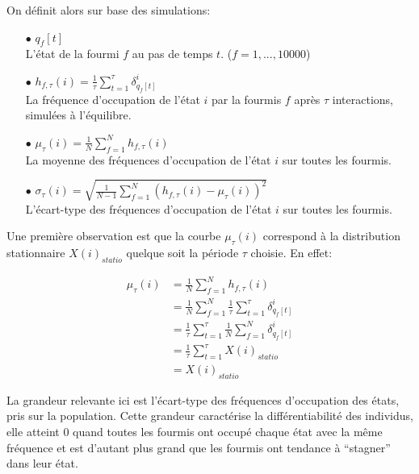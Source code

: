 On définit alors sur base des simulations:

\begin{itemize}

\item[$\bullet$] $q_f[t]$\\
L'état de la fourmi $f$ au pas de temps $t$. ($f=1,...,10000$)\\

\item[$\bullet$] $h_{f,\tau}(i)=\frac{1}{\tau} \sum_{t=1}^{\tau}\delta_{q_f[t]}^i$ \\
La fréquence d'occupation de l'état $i$ par la fourmis $f$ après $\tau$ interactions, simulées à l'équilibre.\\


\item[$\bullet$] $\mu_{\tau}(i) = \frac{1}{N}\sum_{f=1}^N h_{f,\tau}(i)$ \\
La moyenne des fréquences d'occupation de l'état $i$ sur toutes les fourmis.\\

\item[$\bullet$] $\sigma_{\tau}(i) = \sqrt{\frac{1}{N-1}\sum_{f=1}^N (h_{f,\tau}(i)-\mu_{\tau}(i))^2}$ \\
L'écart-type des fréquences d'occupation de l'état $i$ sur toutes les fourmis.\\
\end{itemize}

Une première observation est que la courbe $\mu_{\tau}(i)$ correspond à la distribution stationnaire $X(i)_{statio}$ quelque soit la période $\tau$ choisie. En effet:

\begin{equation}
\begin{aligned}
\mu_{\tau}(i) 	&= \frac{1}{N}\sum_{f=1}^N h_{f,\tau}(i)\\
				&= \frac{1}{N}\sum_{f=1}^N \frac{1}{\tau} \sum_{t=1}^{\tau}\delta_{q_f[t]}^i\\
				&= \frac{1}{\tau} \sum_{t=1}^{\tau} \frac{1}{N}\sum_{f=1}^N \delta_{q_f[t]}^i\\
				&= \frac{1}{\tau} \sum_{t=1}^{\tau} X(i)_{statio}\\
				&= X(i)_{statio}
\end{aligned}
\end{equation}

La grandeur relevante ici est l'écart-type des fréquences d'occupation des états, pris sur la population. Cette grandeur caractérise la différentiabilité des individus, elle atteint 0 quand toutes les fourmis ont occupé chaque état avec la même fréquence et est d'autant plus grand que les fourmis ont tendance à ``stagner'' dans leur état.  \\

